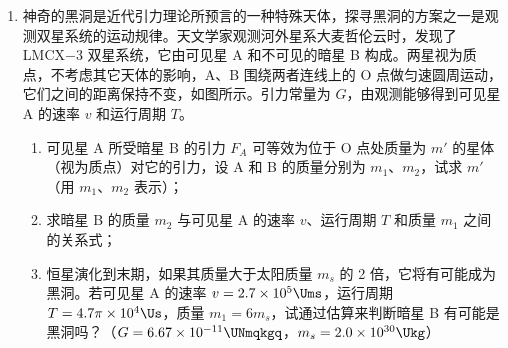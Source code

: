 \documentclass[\gkver]{gaokaozhenti}
\begin{document}
\begin{enumerate}
{（2）粒子从 D 点飞出磁场速度方向改变了 $60^{\circ}$ 角，故 AD 弧所对圆心角为 $60^{\circ}$，粒子做圆周运动的半径为 $R'=r\cot30^{\circ}=\sqrt{3}r$，又 $R'=\frac{mv}{qB'}$，


所以 $B'=\frac{\sqrt{3}}{3}B$。粒子在磁场中飞行时间为 $t=\frac{1}{6}T=\frac{1}{6}\times\frac{2\pi m}{qB'}=\frac{\sqrt{3}\pi r}{3v}$。
}

\item
神奇的黑洞是近代引力理论所预言的一种特殊天体，探寻黑洞的方案之一是观测双星系统的运动规律。天文学家观测河外星系大麦哲伦云时，发现了 LMCX$-$3 双星系统，它由可见星 A 和不可见的暗星 B 构成。两星视为质点，不考虑其它天体的影响，A、B 围绕两者连线上的 O 点做匀速圆周运动，它们之间的距离保持不变，如图所示。引力常量为 $G$，由观测能够得到可见星 A 的速率 $v$ 和运行周期 $T$。

\begin{enumerate}
	\item
	可见星 A 所受暗星 B 的引力 $F_{A}$ 可等效为位于 O 点处质量为 $m'$ 的星体（视为质点）对它的引力，设 A 和 B 的质量分别为 $m_{1}$、$m_{2}$，试求 $m'$（用 $m_{1}$、$m_{2}$ 表示）；
	\item
	求暗星 B 的质量 $m_{2}$ 与可见星 A 的速率 $v$、运行周期 $T$ 和质量 $m_{1}$ 之间的关系式；
	\item
	恒星演化到末期，如果其质量大于太阳质量 $m_{s}$ 的 2 倍，它将有可能成为黑洞。若可见星 A 的速率 $v=2.7\times10^{5}\Ums$，运行周期 $T=4.7\pi\times10^{4}\Us$，质量 $m_{1}=6m_{s}$，试通过估算来判断暗星 B 有可能是黑洞吗？（$G=6.67\times10^{-11}\UNmqkgq$，$m_{s}=2.0\times10^{30}\Ukg$）
\end{enumerate}

\onepicture[align=right, w=4.29cm]{}


\end{enumerate}
\end{document}
